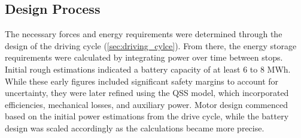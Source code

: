 



\subsection{Design Process}
The necessary forces and energy requirements were determined through the design of the driving cycle (\autoref{sec:driving_cylce}). From there, the energy storage requirements were calculated by integrating power over time between stops. Initial rough estimations indicated a battery capacity of at least 6 to 8 MWh. While these early figures included significant safety margins to account for uncertainty, they were later refined using the QSS model, which incorporated efficiencies, mechanical losses, and auxiliary power. Motor design commenced based on the initial power estimations from the drive cycle, while the battery design was scaled accordingly as the calculations became more precise.